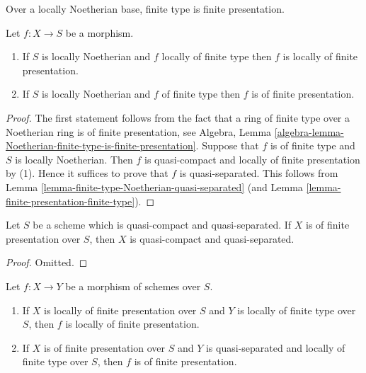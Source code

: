 \begin{lemma}
\label{lemma-noetherian-finite-type-finite-presentation}
\begin{slogan}
Over a locally Noetherian base, finite type is finite presentation.
\end{slogan}
Let $f : X \to S$ be a morphism.
\begin{enumerate}
\item If $S$ is locally Noetherian and $f$ locally of finite type
then $f$ is locally of finite presentation.
\item If $S$ is locally Noetherian and $f$ of finite type
then $f$ is of finite presentation.
\end{enumerate}
\end{lemma}

\begin{proof}
The first statement follows from the fact that a ring
of finite type over a Noetherian ring is of finite presentation, see Algebra,
Lemma \ref{algebra-lemma-Noetherian-finite-type-is-finite-presentation}.
Suppose that $f$ is of finite type and $S$ is locally Noetherian.
Then $f$ is quasi-compact and locally of finite presentation by (1).
Hence it suffices to prove that $f$ is quasi-separated.
This follows from Lemma \ref{lemma-finite-type-Noetherian-quasi-separated}
(and Lemma \ref{lemma-finite-presentation-finite-type}).
\end{proof}

\begin{lemma}
\label{lemma-finite-presentation-quasi-compact-quasi-separated}
Let $S$ be a scheme which is quasi-compact and quasi-separated.
If $X$ is of finite presentation over $S$, then $X$ is quasi-compact
and quasi-separated.
\end{lemma}

\begin{proof}
Omitted.
\end{proof}

\begin{lemma}
\label{lemma-finite-presentation-permanence}
Let $f : X \to Y$ be a morphism of schemes over $S$.
\begin{enumerate}
\item If $X$ is locally of finite presentation over $S$ and
$Y$ is locally of finite type over $S$, then $f$ is locally
of finite presentation.
\item If $X$ is of finite presentation over $S$ and $Y$ is quasi-separated
and locally of finite type over $S$, then $f$ is of finite presentation.
\end{enumerate}
\end{lemma}

